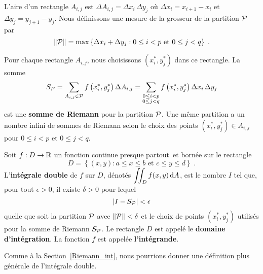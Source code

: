 {L'aire d'un rectangle $A_{i,j}$ est
$\Delta A_{i,j} = \Delta x_i \, \Delta y_j$ où $\Delta x_i = x_{i+1}-x_i$ et
$\Delta y_j = y_{j+1}-y_j$.  Nous définissons une mesure de la grosseur de la
partition $\cal P$ par
\[
\| {\cal P} \| = \max \left\{ \Delta x_i + \Delta y_j : 0\leq i < p
\text{ et } 0 \leq j < q \right\} \; .
\]

Pour chaque rectangle $A_{i,j}$, nous choisissons
$\left(x_i^\ast, y_j^\ast\right)$ dans ce rectangle.  La somme
\[
S_{\cal P} = \sum_{A_{i,j}\in\cal P} f\left(x_i^\ast,y_j^\ast\right) \Delta A_{i,j}
= \sum_{\substack{0 \leq i < p\\ 0 \leq j < q}}
f\left(x_i^\ast,y_j^\ast\right) \Delta x_i \, \Delta y_j
\]
est une {\bfseries somme de Riemann} pour la
partition ${\cal P}$.
Une même partition a un nombre infini de sommes de
Riemann selon le choix des points
$\left(x_i^\ast, y_j^\ast\right) \in A_{i,j}$ pour
$0\leq i <p$ et $0\leq j < q$. 

\begin{focus}[\theory]{\dfn} \label{defDI_rig}
Soit $f:D\rightarrow \mathbb{R}$ un fonction continue presque
partout\footnotemark\ et bornée sur le rectangle
\[
D=\left\{(x,y): a\leq x \leq b \text{ et } c\leq y \leq d \right\}
\; .
\]
L'{\bfseries intégrale double} de $f$ sur $D$,
dénotés $\displaystyle \iint_D f(x,y) \,\mathrm{d}A$, est le nombre $I$ tel
que, pour tout $\epsilon > 0$, il existe $\delta >0$ pour lequel
\[
\left| I - S_{\cal P} \right| < \epsilon
\]
quelle que soit la partition ${\cal P}$ avec $\|{\cal P}\|<\delta$
et le choix de points $(x_i^\ast,y_j^\ast)$ utilisés pour la somme de
Riemann $S_{\cal P}$.  Le rectangle $D$ est appelé le
{\bfseries domaine d'intégration}.  La
fonction $f$ est appelée {\bfseries l'intégrande}.
\end{focus}


Comme à la Section~\ref{Riemann_int}, nous pourrions donner une
définition plus générale de l'intégrale double.

}
